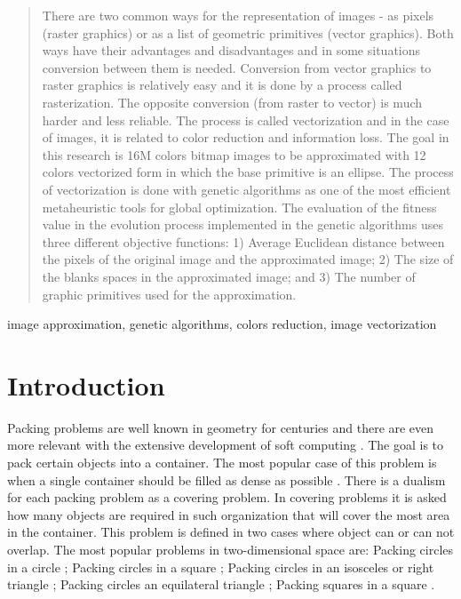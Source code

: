 \documentclass[conference]{IEEEtran}
\begin{document}
\maketitle

\begin{abstract}
There are two common ways for the representation of images - as pixels (raster graphics) or as a list of geometric primitives (vector graphics). Both ways have their advantages and disadvantages and in some situations conversion between them is needed. Conversion from vector graphics to raster graphics is relatively easy and it is done by a process called rasterization. The opposite conversion (from raster to vector) is much harder and less reliable. The process is called vectorization and in the case of images, it is related to color reduction and information loss. The goal in this research is 16M colors bitmap images to be approximated with 12 colors vectorized form in which the base primitive is an ellipse. The process of vectorization is done with genetic algorithms as one of the most efficient metaheuristic tools for global optimization. The evaluation of the fitness value in the evolution process implemented in the genetic algorithms uses three different objective functions: 1) Average Euclidean distance between the pixels of the original image and the approximated image; 2) The size of the blanks spaces in the approximated image; and 3) The number of graphic primitives used for the approximation. 
\end{abstract}

\begin{IEEEkeywords}
image approximation, genetic algorithms, colors reduction, image vectorization
\end{IEEEkeywords}

\section{Introduction}

Packing problems are well known in geometry for centuries and there are even more relevant with the extensive development of soft computing \cite{Angelova-2009}. The goal is to pack certain objects into a container. The most popular case of this problem is when a single container should be filled as dense as possible \cite{Lodi-Martello-Monaci-2002}. There is a dualism for each packing problem as a covering problem. In covering problems it is asked how many objects are required in such organization that will cover the most area in the container. This problem is defined in two cases where object can or can not overlap. The most popular problems in two-dimensional space are: Packing circles in a circle \cite{Fodor-2003}; Packing circles in a square \cite{Huang-Ye-2010}; Packing circles in an isosceles or right triangle \cite{Xu-1996}; Packing circles an equilateral triangle \cite{Nurmela-2000}; Packing squares in a square \cite{Stromquist-2003}.
\end{document}
